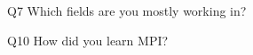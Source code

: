 \begin{description}%
\item{Q7} Which fields are you mostly working in?%
\item{Q10} How did you learn MPI?%
\end{description}%
